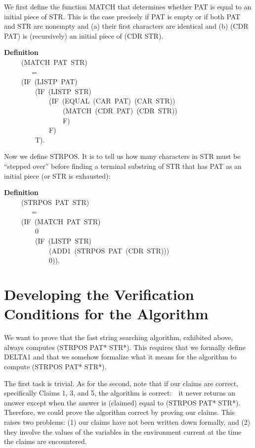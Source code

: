 \documentclass[10pt]{book}
\newenvironment{pubasis}{\begin{flushleft}}{\end{flushleft}}
\newcommand{\axiomordefinition}[1]{\vspace{6pt}\Large\textsf{\textbf{#1}}\normalsize}
\begin{document}
We first define the function MATCH that determines whether PAT
is equal to an initial piece of STR.  This is the case precisely if PAT is empty
or if both PAT and STR are nonempty and (a) their first characters
are identical and (b) (CDR PAT) is (recursively) an initial piece of (CDR STR).
\begin{pubasis}
\axiomordefinition{Definition}\\
~~~~~(MATCH~PAT~STR)\\
~~~~~~~~=\\
~~~~~(IF~(LISTP~PAT)\\
~~~~~~~~~(IF~(LISTP~STR)\\
~~~~~~~~~~~~~(IF~(EQUAL~(CAR~PAT)~(CAR~STR))\\
~~~~~~~~~~~~~~~~~(MATCH~(CDR~PAT)~(CDR~STR))\\
~~~~~~~~~~~~~~~~~F)\\
~~~~~~~~~~~~~F)\\
~~~~~~~~~T).\\
\end{pubasis}
Now we define STRPOS.  It is to tell us how many characters in STR
must be ``stepped over'' before finding a terminal substring of STR
that has PAT as an initial piece (or STR is exhausted):
\begin{pubasis}
\axiomordefinition{Definition}\\
~~~~~(STRPOS~PAT~STR)\\
~~~~~~~~=\\
~~~~~(IF~(MATCH~PAT~STR)\\
~~~~~~~~~0\\
~~~~~~~~~(IF~(LISTP~STR)\\
~~~~~~~~~~~~~(ADD1~(STRPOS~PAT~(CDR~STR)))\\
~~~~~~~~~~~~~0)).\\
\end{pubasis}
\section{Developing the Verification Conditions for the Algorithm}
We want to prove that the fast string searching algorithm,
exhibited above, always computes
(STRPOS PAT* STR*).  This requires that we formally define DELTA1 and
that we somehow formalize what it means for the algorithm to compute
(STRPOS PAT* STR*).

The first task is trivial.  As for the second, note that if our claims are correct, specifically Claims 1,
3, and 5, the algorithm is correct:~~it never returns an answer except
when the answer is (claimed) equal to (STRPOS PAT* STR*).  Therefore,
we could prove the algorithm correct by proving our claims.  This raises
two problems: (1) our claims have not been written down formally, and
(2) they involve the values of the variables in the
environment current at the time the claims are encountered.
\end{document}
